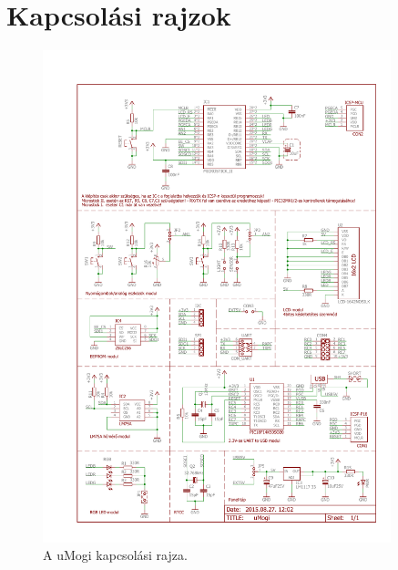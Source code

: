\clearpage
\section{Kapcsolási rajzok}


\begin{figure}[!ht]
\centering
\includegraphics[width=0.9\textwidth, keepaspectratio]{figures/uMogi.pdf}
\caption{A uMogi kapcsolási rajza.} 
\end{figure}
